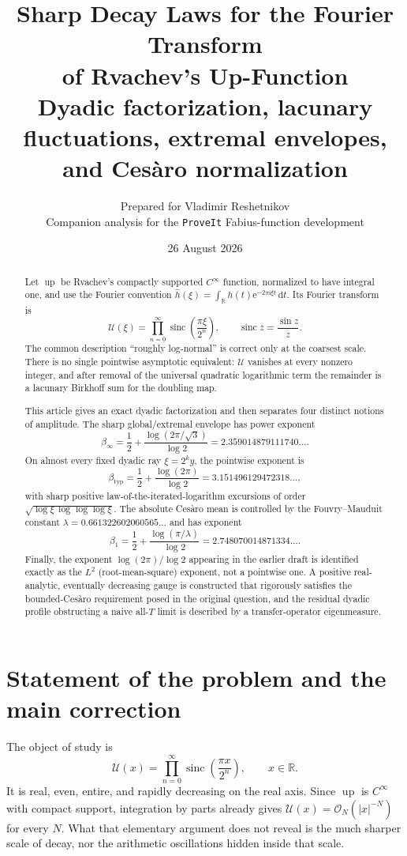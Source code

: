 \documentclass[11pt,oneside]{article}
\title{\bfseries Sharp Decay Laws for the Fourier Transform\\
of Rvachev's Up-Function\\[0.35em]
\large Dyadic factorization, lacunary fluctuations, extremal envelopes, and Ces\`aro normalization}
\author{Prepared for Vladimir Reshetnikov\\
\small Companion analysis for the \texttt{ProveIt} Fabius-function development}
\date{26 August 2026}
\theoremstyle{definition}
\theoremstyle{remark}
\newcommand{\R}{\mathbb R}
\newcommand{\e}{\mathrm e}
\newcommand{\ii}{\mathrm i}
\newcommand{\dd}{\,\mathrm d}
\newcommand{\Up}{\operatorname{up}}
\newcommand{\sinc}{\operatorname{sinc}}
\newcommand{\Uhat}{\mathcal U}
\newcommand{\bigO}{\mathcal O}
\begin{document}
\maketitle

\begin{abstract}
Let $\Up$ be Rvachev's compactly supported $C^\infty$ function, normalized to have
integral one, and use the Fourier convention
$\widehat h(\xi)=\int_{\R}h(t)\e^{-2\pi\ii\xi t}\dd t$.  Its Fourier transform is
\[
 \Uhat(\xi)=\prod_{n=0}^{\infty}
 \sinc\!\left(\frac{\pi\xi}{2^n}\right),
 \qquad \sinc z=\frac{\sin z}{z}.
\]
The common description ``roughly log-normal'' is correct only at the coarsest scale.
There is no single pointwise asymptotic equivalent: $\Uhat$ vanishes at every nonzero
integer, and after removal of the universal quadratic logarithmic term the remainder is
a lacunary Birkhoff sum for the doubling map.

This article gives an exact dyadic factorization and then separates four distinct notions
of amplitude.  The sharp global/extremal envelope has power exponent
\[
 \beta_\infty=\frac12+\frac{\log(2\pi/\sqrt3)}{\log2}
 =2.359014879111740\ldots .
\]
On almost every fixed dyadic ray $\xi=2^k y$, the pointwise exponent is
\[
 \beta_{\mathrm{typ}}=\frac12+\frac{\log(2\pi)}{\log2}
 =3.151496129472318\ldots ,
\]
with sharp positive law-of-the-iterated-logarithm excursions of order
$\sqrt{\log\xi\,\log\log\log\xi}$.  The absolute Ces\`aro mean is controlled by the
Fouvry--Mauduit constant $\lambda=0.661322602060565\ldots$ and has exponent
\[
 \beta_1=\frac12+\frac{\log(\pi/\lambda)}{\log2}
 =2.748070014871334\ldots .
\]
Finally, the exponent $\log(2\pi)/\log2$ appearing in the earlier draft is identified
exactly as the $L^2$ (root-mean-square) exponent, not a pointwise one.  A positive
real-analytic, eventually decreasing gauge is constructed that rigorously satisfies the
bounded-Ces\`aro requirement posed in the original question, and the residual dyadic
profile obstructing a naive all-$T$ limit is described by a transfer-operator eigenmeasure.
\end{abstract}

\tableofcontents
\newpage

\section{Statement of the problem and the main correction}

The object of study is
\begin{equation}\label{eq:def-U}
 \Uhat(x)=\prod_{n=0}^{\infty}
 \sinc\!\left(\frac{\pi x}{2^n}\right),
 \qquad x\in\R.
\end{equation}
It is real, even, entire, and rapidly decreasing on the real axis.  Since $\Up$ is
$C^\infty$ with compact support, integration by parts already gives
$\Uhat(x)=\bigO_N(|x|^{-N})$ for every $N$.  What that elementary argument does not
reveal is the much sharper scale of decay, nor the arithmetic oscillations hidden inside
that scale.
\end{document}
